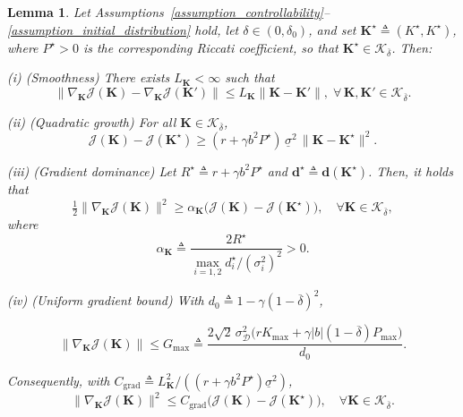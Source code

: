 \documentclass[letterpaper, 10 pt, conference]{ieeeconf}
\newcommand{\bK}{\mathbf{K}}
\newcommand{\cD}{\mathcal{D}}
\newcommand{\cJ}{\mathcal{J}}
\newcommand{\cK}{\mathcal{K}}
\newcommand{\slo}{\underline{\sigma}}
\newtheorem{lemma}{Lemma}
\begin{document}
\begin{lemma}\label{lemma_J_geometry}
    Let Assumptions~\ref{assumption_controllability}--\ref{assumption_initial_distribution} hold, let $\delta\in(0,\delta_0)$, and set $\bK^\star \triangleq (K^{\star}, K^{\star})$, where $P^{\star} > 0$ is the corresponding Riccati coefficient, so that $\bK^{\star} \in \cK_{\overline{\delta}}$. Then:
 
    (i) (Smoothness) There exists $L_\bK<\infty$ such that
    \begin{equation}
        \| \nabla_{\bK} \cJ(\bK) {-} \nabla_{\bK} \cJ(\bK')\|
        {\le}
        L_\bK \|\bK {-} \bK'\|,
        \; \forall\, \bK, \bK' {\in} \cK_{\overline{\delta}}.
    \end{equation}
 
    (ii) (Quadratic growth) For all $\bK \in \cK_{\overline{\delta}}$,
    \begin{equation}
        \cJ(\bK)-\cJ(\bK^\star)
        \ge
        (r+\gamma b^2P^\star)\,\slo^{2} \,\|\bK - \bK^\star\|^2.
    \end{equation}
 
    (iii) (Gradient dominance) Let $R^{\star}\triangleq r+\gamma b^2P^{\star}$ and $\mathbf d^{\star}\triangleq\mathbf d(\bK^{\star})$. Then, it holds that
      \begin{equation}
        \tfrac{1}{2} \| \nabla_{\bK} \cJ(\bK)\|^2
        \ge
        \alpha_{\bK} \bigl( \cJ(\bK) - \cJ(\bK^\star) \bigr),
        \quad
        \forall \bK \in \cK_{\overline{\delta}},
    \end{equation}
    where
    \begin{equation}\label{eq_explicit_pl}
        \alpha_{\bK}\triangleq
        \frac{2R^{\star}}{\max_{i=1,2}d_i^{\star}/(\sigma_i^2)^2}>0.
    \end{equation}
  
 
    (iv) (Uniform gradient bound) With $d_0 \triangleq 1 - \gamma(1 - \overline{\delta})^{2}$,

    \vspace{-0.2cm}
    \begin{equation}
        \|\nabla_{\bK} \cJ(\bK)\| {\le} G_{\max}
        {\triangleq}
        \frac{2\sqrt{2}\,\sigma_{\cD}^2 \bigl(rK_{\max}+\gamma |b|(1-\overline\delta)P_{\max}\bigr)}{ d_0}.
    \end{equation}
    \vspace{-0.2cm}
 
    Consequently, with $C_{\mathrm{grad}} \triangleq {L_\bK^2}/{((r{+}\gamma b^2P^\star)\slo^{2})}$,
    \begin{equation} \label{eq_cgrad}
        \| \nabla_{\bK} \cJ(\bK)\|^2
        \le
        C_{\mathrm{grad}} \bigl( \cJ(\bK) - \cJ(\bK^\star) \bigr),
        \quad \forall \bK \in \cK_{\overline{\delta}}.
    \end{equation}
\end{lemma}
 
\end{document}
